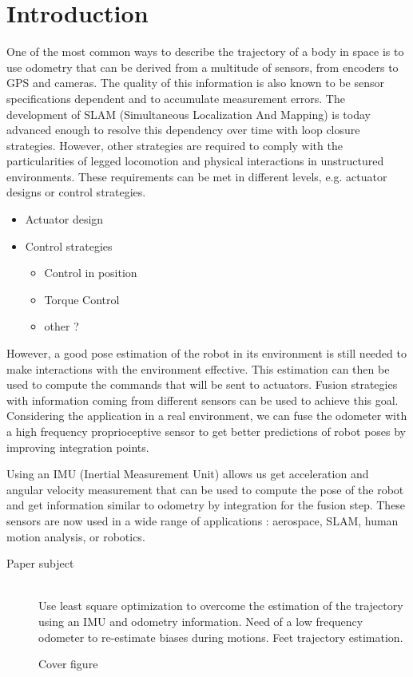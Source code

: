 
\section{Introduction}\label{sec:intro}

One of the most common ways to describe the trajectory of a body in space is to use odometry that can be derived from a multitude of sensors, from encoders to GPS and cameras.
The quality of this information is also known to be sensor specifications dependent and to accumulate measurement errors. The development of SLAM (Simultaneous Localization And Mapping) is today advanced enough to resolve 
this dependency over time with loop closure strategies. However, other strategies are required to comply with the particularities of legged locomotion and physical interactions in unstructured environments. These requirements can be met in 
different levels, e.g. actuator designs or control strategies.

  \begin{itemize}
   \item Actuator design  \cite{wensing2017proprioceptive}
   \item Control strategies
    \begin{itemize}
     \item Control in position
     \item Torque Control
     \item other ?
    \end{itemize}
  \end{itemize}

However, a good pose estimation of the robot in its environment is still needed to make interactions with the environment effective. This estimation can then be used to compute the commands that will be sent to actuators.
Fusion strategies with information coming from different sensors can be used to achieve this goal. Considering the application in a real environment, we can fuse the odometer with a high frequency proprioceptive sensor 
to get better predictions of robot poses by improving integration points.

Using an IMU (Inertial Measurement Unit) allows us get acceleration and angular velocity measurement that can be used to compute the pose of the robot and get information similar to odometry by integration for the fusion step.
These sensors are now used in a wide range of applications : aerospace, SLAM, human motion analysis, or robotics.


\begin{description}
 \item [Paper subject] \hfill \\ Use least square optimization to overcome the estimation of the trajectory using an IMU and odometry information. Need of a low frequency odometer to re-estimate biases during motions. Feet trajectory estimation.
\end{description}


\begin{figure}
\centering
	\caption{Cover figure}
	\label{fig:cover}
\end{figure}

